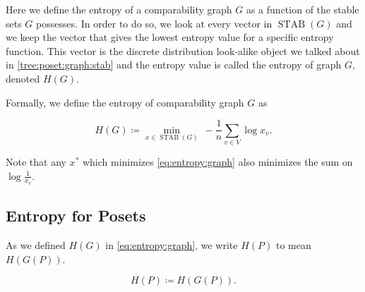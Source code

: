 Here we define the entropy of a comparability graph $G$ as a function of the
stable sets $G$ possesses. In order to do so, we look at every vector in
$\operatorname{STAB}(G)$ and we keep the vector that gives the lowest entropy
value for a specific entropy function. This vector is the discrete distribution
look-alike object we talked about in \ref{tree:poset:graph:stab} and the
entropy value is called the entropy of graph $G$, denoted ${H}(G)$.

Formally, we define the entropy of comparability graph $G$ as

\begin{equation}
{H}(G) \coloneqq \min_{x \in \operatorname{STAB}(G)}~ -\frac{1}{n} \sum_{v \in
V} \log x_v.
\label{eq:entropy:graph}
\end{equation}

Note that any $x^*$ which minimizes \ref{eq:entropy:graph} also minimizes the
sum on $\log \frac{1}{x_v}$.



\subsection*{Entropy for Posets}


As we defined ${H}(G)$ in \ref{eq:entropy:graph}, we write ${H}(P)$ to mean
${H}(G(P))$.

\begin{equation}
{H}(P) \coloneqq {H}({G}(P)).
\label{eq:entropy:poset}
\end{equation}

